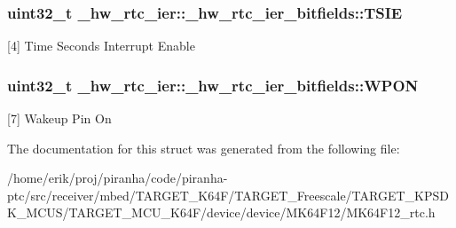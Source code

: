 \subsubsection[{\texorpdfstring{T\+S\+IE}{TSIE}}]{\setlength{\rightskip}{0pt plus 5cm}uint32\+\_\+t \+\_\+hw\+\_\+rtc\+\_\+ier\+::\+\_\+hw\+\_\+rtc\+\_\+ier\+\_\+bitfields\+::\+T\+S\+IE}\hypertarget{struct__hw__rtc__ier_1_1__hw__rtc__ier__bitfields_a08a5bebf1769badc16164f035f887b7f}{}\label{struct__hw__rtc__ier_1_1__hw__rtc__ier__bitfields_a08a5bebf1769badc16164f035f887b7f}
\mbox{[}4\mbox{]} Time Seconds Interrupt Enable 
\subsubsection[{\texorpdfstring{W\+P\+ON}{WPON}}]{\setlength{\rightskip}{0pt plus 5cm}uint32\+\_\+t \+\_\+hw\+\_\+rtc\+\_\+ier\+::\+\_\+hw\+\_\+rtc\+\_\+ier\+\_\+bitfields\+::\+W\+P\+ON}\hypertarget{struct__hw__rtc__ier_1_1__hw__rtc__ier__bitfields_aceb8a7f4af05330f522bb12ec42f433e}{}\label{struct__hw__rtc__ier_1_1__hw__rtc__ier__bitfields_aceb8a7f4af05330f522bb12ec42f433e}
\mbox{[}7\mbox{]} Wakeup Pin On 

The documentation for this struct was generated from the following file\+:\begin{DoxyCompactItemize}
\item 
/home/erik/proj/piranha/code/piranha-\/ptc/src/receiver/mbed/\+T\+A\+R\+G\+E\+T\+\_\+\+K64\+F/\+T\+A\+R\+G\+E\+T\+\_\+\+Freescale/\+T\+A\+R\+G\+E\+T\+\_\+\+K\+P\+S\+D\+K\+\_\+\+M\+C\+U\+S/\+T\+A\+R\+G\+E\+T\+\_\+\+M\+C\+U\+\_\+\+K64\+F/device/device/\+M\+K64\+F12/M\+K64\+F12\+\_\+rtc.\+h\end{DoxyCompactItemize}
